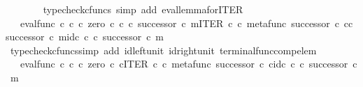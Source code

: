 \begin{isabellebody}
\ \ \ \ \ \ \isamarkupfalse%
\ {\isacharparenleft}{\kern0pt}typecheck{\isacharunderscore}{\kern0pt}cfuncs{\isacharcomma}{\kern0pt}\ simp\ add{\isacharcolon}{\kern0pt}\ eval{\isacharunderscore}{\kern0pt}lemma{\isacharunderscore}{\kern0pt}for{\isacharunderscore}{\kern0pt}ITER{\isacharparenright}{\kern0pt}\isanewline
\ \ \ \ \isamarkupfalse%
\ \isamarkupfalse%
\ {\isachardoublequoteopen}{\isachardot}{\kern0pt}{\isachardot}{\kern0pt}{\isachardot}{\kern0pt}\ {\isacharequal}{\kern0pt}\ eval{\isacharunderscore}{\kern0pt}func\ {\isasymnat}\isactrlsub c\ {\isasymnat}\isactrlsub c\ {\isasymcirc}\isactrlsub c\ {\isasymlangle}zero\ {\isasymcirc}\isactrlsub c\ {\isasymbeta}\isactrlbsub {\isasymnat}\isactrlsub c\isactrlesub \ {\isasymcirc}\isactrlsub c\ {\isacharparenleft}{\kern0pt}successor\ {\isasymcirc}\isactrlsub c\ m{\isacharparenright}{\kern0pt}{\isacharcomma}{\kern0pt}ITER\ {\isasymnat}\isactrlsub c\ {\isasymcirc}\isactrlsub c\ {\isasymlangle}metafunc\ successor\ {\isasymcirc}\isactrlsub c\ {\isasymbeta}\isactrlbsub {\isasymnat}\isactrlsub c\isactrlesub {\isasymcirc}\isactrlsub c\ {\isacharparenleft}{\kern0pt}successor\ {\isasymcirc}\isactrlsub c\ m{\isacharparenright}{\kern0pt}{\isacharcomma}{\kern0pt}id\isactrlsub c\ {\isasymnat}\isactrlsub c\ {\isasymcirc}\isactrlsub c\ {\isacharparenleft}{\kern0pt}successor\ {\isasymcirc}\isactrlsub c\ m{\isacharparenright}{\kern0pt}{\isasymrangle}{\isasymrangle}{\isachardoublequoteclose}\isanewline
\ \ \ \ \ \ \isamarkupfalse%
\ {\isacharparenleft}{\kern0pt}typecheck{\isacharunderscore}{\kern0pt}cfuncs{\isacharcomma}{\kern0pt}simp\ add{\isacharcolon}{\kern0pt}\ id{\isacharunderscore}{\kern0pt}left{\isacharunderscore}{\kern0pt}unit{}\ id{\isacharunderscore}{\kern0pt}right{\isacharunderscore}{\kern0pt}unit{}\ terminal{\isacharunderscore}{\kern0pt}func{\isacharunderscore}{\kern0pt}comp{\isacharunderscore}{\kern0pt}elem{\isacharparenright}{\kern0pt}\isanewline
\ \ \ \ \isamarkupfalse%
\ \isamarkupfalse%
\ {\isachardoublequoteopen}{\isachardot}{\kern0pt}{\isachardot}{\kern0pt}{\isachardot}{\kern0pt}\ {\isacharequal}{\kern0pt}\ {\isacharparenleft}{\kern0pt}{\isacharparenleft}{\kern0pt}eval{\isacharunderscore}{\kern0pt}func\ {\isasymnat}\isactrlsub c\ {\isasymnat}\isactrlsub c\ {\isasymcirc}\isactrlsub c\ {\isasymlangle}zero\ {\isasymcirc}\isactrlsub c\ {\isasymbeta}\isactrlbsub {\isasymnat}\isactrlsub c\isactrlesub {\isacharcomma}{\kern0pt}ITER\ {\isasymnat}\isactrlsub c\ {\isasymcirc}\isactrlsub c\ {\isasymlangle}metafunc\ successor\ {\isasymcirc}\isactrlsub c\ {\isasymbeta}\isactrlbsub {\isasymnat}\isactrlsub c\isactrlesub {\isacharcomma}{\kern0pt}id\isactrlsub c\ {\isasymnat}\isactrlsub c{\isasymrangle}{\isasymrangle}{\isacharparenright}{\kern0pt}\ {\isasymcirc}\isactrlsub c\ successor{\isacharparenright}{\kern0pt}\ {\isasymcirc}\isactrlsub c\ m{\isachardoublequoteclose}\isanewline

\end{isabellebody}
